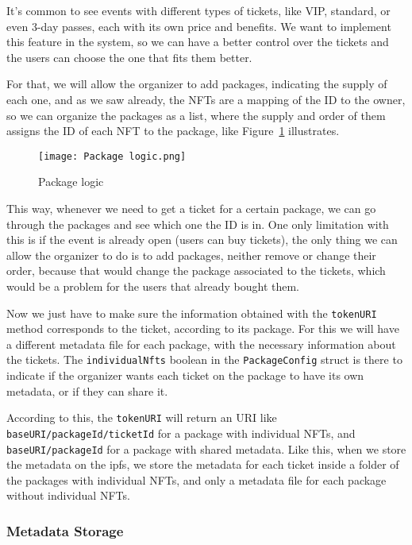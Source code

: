 It's common to see events with different types of tickets, like VIP, standard,
or even 3-day passes, each with its own price and benefits. We want to
implement this feature in the system, so we can have a better control over the
tickets and the users can choose the one that fits them better.

For that, we will allow the organizer to add packages, indicating the supply of
each one, and as we saw already, the NFTs are a mapping of the ID to the owner,
so we can organize the packages as a list, where the supply and order of them
assigns the ID of each NFT to the package, like Figure~\ref{fig:package_logic}
illustrates.

\begin{figure}[H]
	\texttt{[image: Package logic.png]}
	\centering
	\caption{Package logic}\label{fig:package_logic}
\end{figure}

This way, whenever we need to get a ticket for a certain package, we can go
through the packages and see which one the ID is in. One only limitation with
this is if the event is already open (users can buy tickets), the only thing we
can allow the organizer to do is to add packages, neither remove or change
their order, because that would change the package associated to the tickets,
which would be a problem for the users that already bought them.

Now we just have to make sure the information obtained with the
\texttt{tokenURI} method corresponds to the ticket, according to its package.
For this we will have a different metadata file for each package, with the
necessary information about the tickets. The \texttt{individualNfts} boolean in
the \texttt{PackageConfig} struct is there to indicate if the organizer wants
each ticket on the package to have its own metadata, or if they can share it.

According to this, the \texttt{tokenURI} will return an URI like
\texttt{baseURI/packageId/ticketId} for a package with individual NFTs, and
\texttt{baseURI/packageId} for a package with shared metadata. Like this, when
we store the metadata on the \gls{ipfs}, we store the metadata for each ticket
inside a folder of the packages with individual NFTs, and only a metadata file
for each package without individual NFTs.

\subsubsection{Metadata Storage}\label{subsubsec:metadata_storage}

